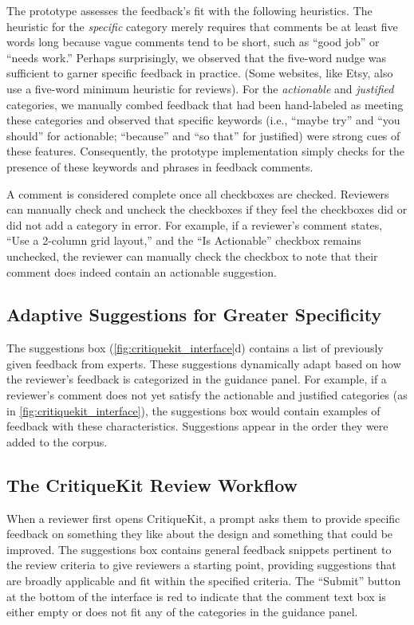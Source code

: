 The prototype assesses the feedback's fit with the following heuristics. The heuristic for the \textit{specific} category merely requires that comments be at least five words long because vague comments tend to be short, such as ``good job'' or ``needs work.'' Perhaps surprisingly, we observed that the five-word nudge was sufficient to garner specific feedback in practice. (Some websites, like Etsy, also use a five-word minimum heuristic for reviews). For the \textit{actionable} and \textit{justified} categories, we manually combed feedback that had been hand-labeled as meeting these categories and observed that specific keywords (i.e., ``maybe try'' and ``you should'' for actionable; ``because'' and ``so that'' for justified) were strong cues of these features. Consequently, the prototype implementation simply checks for the presence of these keywords and phrases in feedback comments. 

A comment is considered complete once all checkboxes are checked. Reviewers can manually check and uncheck the checkboxes if they feel the checkboxes did or did not add a category in error. For example, if a reviewer's comment states, ``Use a 2-column grid layout,'' and the ``Is Actionable'' checkbox remains unchecked, the reviewer can manually check the checkbox to note that their comment does indeed contain an actionable suggestion. 

\subsection{Adaptive Suggestions for Greater Specificity}
The suggestions box (\autoref{fig:critiquekit_interface}d) contains a list of previously given feedback from experts. These suggestions dynamically adapt based on how the reviewer's feedback is categorized in the guidance panel. For example, if a reviewer's comment does not yet satisfy the actionable and justified categories (as in \autoref{fig:critiquekit_interface}), the suggestions box would contain examples of feedback with these characteristics. Suggestions appear in the order they were added to the corpus.

\subsection{The CritiqueKit Review Workflow}
When a reviewer first opens CritiqueKit, a prompt asks them to provide specific feedback on something they like about the design and something that could be improved. The suggestions box contains general feedback snippets \cite{Kulkarni2013} pertinent to the review criteria to give reviewers a starting point, providing suggestions that are broadly applicable and fit within the specified criteria. The ``Submit'' button at the bottom of the interface is red to indicate that the comment text box is either empty or does not fit any of the categories in the guidance panel. 


